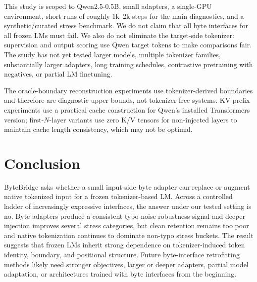 \documentclass{article}
\newcommand{\bb}{ByteBridge}
\newcommand{\qwen}{Qwen2.5-0.5B}
\begin{document}
This study is scoped to \qwen{}, small adapters, a single-GPU environment, short runs of roughly 1k--2k steps for the main diagnostics, and a synthetic/curated stress benchmark. We do not claim that all byte interfaces for all frozen LMs must fail. We also do not eliminate the target-side tokenizer: supervision and output scoring use Qwen target tokens to make comparisons fair. The study has not yet tested larger models, multiple tokenizer families, substantially larger adapters, long training schedules, contrastive pretraining with negatives, or partial LM finetuning.

The oracle-boundary reconstruction experiments use tokenizer-derived boundaries and therefore are diagnostic upper bounds, not tokenizer-free systems. KV-prefix experiments use a practical cache construction for Qwen's installed Transformers version; first-$N$-layer variants use zero K/V tensors for non-injected layers to maintain cache length consistency, which may not be optimal.

\section{Conclusion}

\bb{} asks whether a small input-side byte adapter can replace or augment native tokenized input for a frozen tokenizer-based LM. Across a controlled ladder of increasingly expressive interfaces, the answer under our tested setting is no. Byte adapters produce a consistent typo-noise robustness signal and deeper injection improves several stress categories, but clean retention remains too poor and native tokenization continues to dominate non-typo stress buckets. The result suggests that frozen LMs inherit strong dependence on tokenizer-induced token identity, boundary, and positional structure. Future byte-interface retrofitting methods likely need stronger objectives, larger or deeper adapters, partial model adaptation, or architectures trained with byte interfaces from the beginning.
\end{document}
